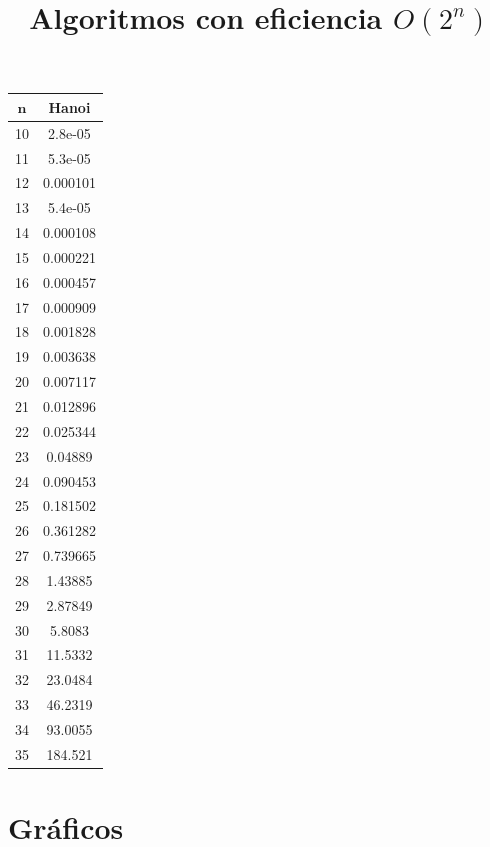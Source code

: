 \documentclass[a4]{article}
\begin{document}
\begin{table}[H]
\begin{minipage}{0.4\textwidth}
\centering
\title{\large Algoritmos con eficiencia $O(2^n)$ \\ \vspace{4mm}}
\begin{tabular}{| c c |}
\hline
$\textbf{n}$ & \textbf{Hanoi} \\ \hline
  10 &	2.8e-05  \\
  11 &	5.3e-05  \\
  12 &	0.000101 \\
  13 &	5.4e-05  \\
  14 &	0.000108 \\
  15 &	0.000221 \\
  16 &	0.000457 \\
  17 & 	0.000909 \\
  18 &	0.001828 \\
  19 &	0.003638 \\
  20 &	0.007117 \\
  21 &	0.012896 \\
  22 &	0.025344 \\
  23 &	0.04889  \\
  24 &	0.090453 \\
  25 &	0.181502 \\
  26 &	0.361282 \\
  27 &	0.739665 \\
  28 &	1.43885  \\
  29 &	2.87849  \\
  30 &	5.8083   \\
  31 &	11.5332  \\
  32 &	23.0484  \\
  33 &	46.2319  \\
  34 &	93.0055  \\
  35 &	184.521  \\ \hline
\end{tabular}
\end{minipage}
\end{table}

\section{Gráficos}
\end{document}
